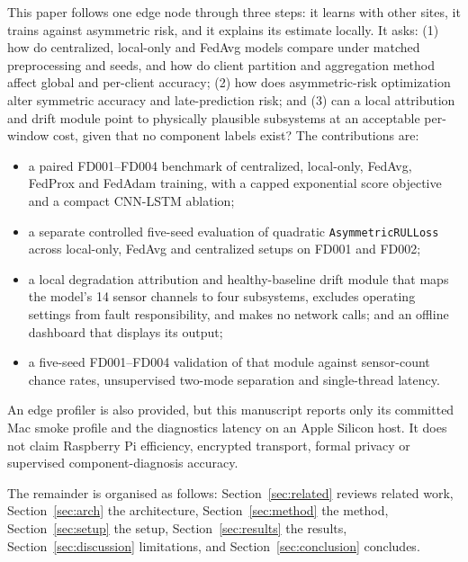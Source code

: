 This paper follows one edge node through three steps: it learns with other sites, it trains against asymmetric risk, and it explains its estimate locally. It asks: (1) how do centralized, local-only and FedAvg models compare under matched preprocessing and seeds, and how do client partition and aggregation method affect global and per-client accuracy; (2) how does asymmetric-risk optimization alter symmetric accuracy and late-prediction risk; and (3) can a local attribution and drift module point to physically plausible subsystems at an acceptable per-window cost, given that no component labels exist? The contributions are:
\begin{itemize}
\item a paired FD001--FD004 benchmark of centralized, local-only, FedAvg, FedProx and FedAdam training, with a capped exponential score objective and a compact CNN-LSTM ablation;
\item a separate controlled five-seed evaluation of quadratic \texttt{AsymmetricRULLoss} across local-only, FedAvg and centralized setups on FD001 and FD002;
\item a local degradation attribution and healthy-baseline drift module that maps the model's 14 sensor channels to four subsystems, excludes operating settings from fault responsibility, and makes no network calls; and an offline dashboard that displays its output;
\item a five-seed FD001--FD004 validation of that module against sensor-count chance rates, unsupervised two-mode separation and single-thread latency.
\end{itemize}
An edge profiler is also provided, but this manuscript reports only its committed Mac smoke profile and the diagnostics latency on an Apple Silicon host. It does not claim Raspberry Pi efficiency, encrypted transport, formal privacy or supervised component-diagnosis accuracy.

The remainder is organised as follows: Section~\ref{sec:related} reviews related work, Section~\ref{sec:arch} the architecture, Section~\ref{sec:method} the method, Section~\ref{sec:setup} the setup, Section~\ref{sec:results} the results, Section~\ref{sec:discussion} limitations, and Section~\ref{sec:conclusion} concludes.
